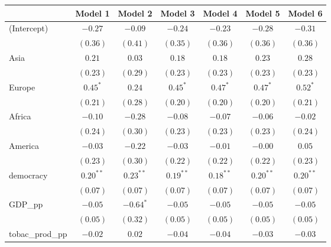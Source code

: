 
\begin{table}[!h]
\begin{center}
\begin{tabular}{l c c c c c c }
\toprule
 & Model 1 & Model 2 & Model 3 & Model 4 & Model 5 & Model 6 \\
\midrule
(Intercept)             & $-0.27$      & $-0.09$      & $-0.24$      & $-0.23$      & $-0.28$      & $-0.31$      \\
                        & $(0.36)$     & $(0.41)$     & $(0.35)$     & $(0.36)$     & $(0.36)$     & $(0.36)$     \\
Asia                    & $0.21$       & $0.03$       & $0.18$       & $0.18$       & $0.23$       & $0.28$       \\
                        & $(0.23)$     & $(0.29)$     & $(0.23)$     & $(0.23)$     & $(0.23)$     & $(0.23)$     \\
Europe                  & $0.45^{*}$   & $0.24$       & $0.45^{*}$   & $0.47^{*}$   & $0.47^{*}$   & $0.52^{*}$   \\
                        & $(0.21)$     & $(0.28)$     & $(0.20)$     & $(0.20)$     & $(0.20)$     & $(0.21)$     \\
Africa                  & $-0.10$      & $-0.28$      & $-0.08$      & $-0.07$      & $-0.06$      & $-0.02$      \\
                        & $(0.24)$     & $(0.30)$     & $(0.23)$     & $(0.23)$     & $(0.23)$     & $(0.24)$     \\
America                 & $-0.03$      & $-0.22$      & $-0.03$      & $-0.01$      & $-0.00$      & $0.05$       \\
                        & $(0.23)$     & $(0.30)$     & $(0.22)$     & $(0.22)$     & $(0.22)$     & $(0.23)$     \\
democracy               & $0.20^{**}$  & $0.23^{**}$  & $0.19^{**}$  & $0.18^{**}$  & $0.20^{**}$  & $0.20^{**}$  \\
                        & $(0.07)$     & $(0.07)$     & $(0.07)$     & $(0.07)$     & $(0.07)$     & $(0.07)$     \\
GDP\_pp                 & $-0.05$      & $-0.64^{*}$  & $-0.05$      & $-0.05$      & $-0.05$      & $-0.05$      \\
                        & $(0.05)$     & $(0.32)$     & $(0.05)$     & $(0.05)$     & $(0.05)$     & $(0.05)$     \\
tobac\_prod\_pp         & $-0.02$      & $0.02$       & $-0.04$      & $-0.04$      & $-0.03$      & $-0.03$      \\

\end{tabular}
\end{center}
\end{table}
